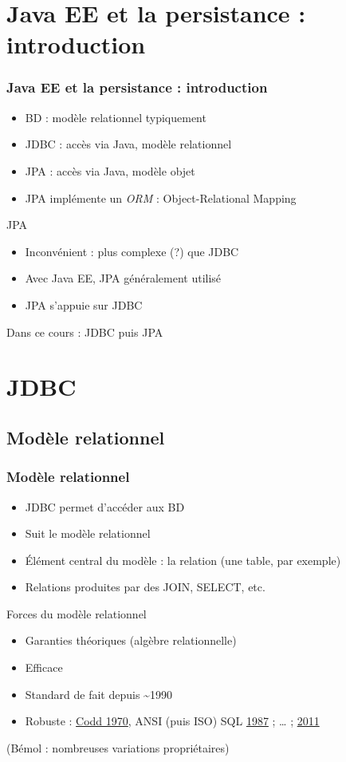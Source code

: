 \documentclass[english, french]{beamer}
\begin{document}
\section[Java EE et la persistance]{Java EE et la persistance : introduction}
\begin{frame}
	\frametitle{Java EE et la persistance : introduction}
	\begin{itemize}
		\item BD : modèle relationnel {\tiny typiquement}
		\item JDBC : accès via Java, modèle relationnel
		\item JPA : accès via Java, modèle objet
		\item JPA implémente un \emph{ORM} : Object-Relational Mapping
	\end{itemize}
	\begin{block}{JPA}
		\begin{itemize}
			\item Inconvénient : plus complexe (?) que JDBC 
			\item Avec Java EE, JPA généralement utilisé
			\item JPA s’appuie sur JDBC
		\end{itemize}
	\end{block}
	Dans ce cours : JDBC puis JPA
\end{frame}

\section{JDBC}
\subsection{Modèle relationnel}
\begin{frame}
	\frametitle{Modèle relationnel}
	\begin{itemize}
		\item JDBC permet d’accéder aux BD
		\item Suit le modèle relationnel
		\item Élément central du modèle : la relation (une table, par exemple)
		\item Relations produites par des JOIN, SELECT, etc.
	\end{itemize}
	\begin{block}{Forces du modèle relationnel}
		\pause
		\begin{itemize}
			\item Garanties théoriques (algèbre relationnelle)
			\item Efficace
			\item Standard de fait depuis \textasciitilde 1990
			\item Robuste : \href{http://dl.acm.org/citation.cfm?id=362685}{Codd 1970}, ANSI (puis ISO) SQL \href{http://www.iso.org/iso/home/store/catalogue_ics/catalogue_detail_ics.htm?csnumber=16661}{1987} ; … ; \href{http://www.iso.org/iso/home/store/catalogue_ics/catalogue_detail_ics.htm?csnumber=53681}{2011}
		\end{itemize}
	\end{block}
	(Bémol : nombreuses variations propriétaires)
\end{frame}
\end{document}
